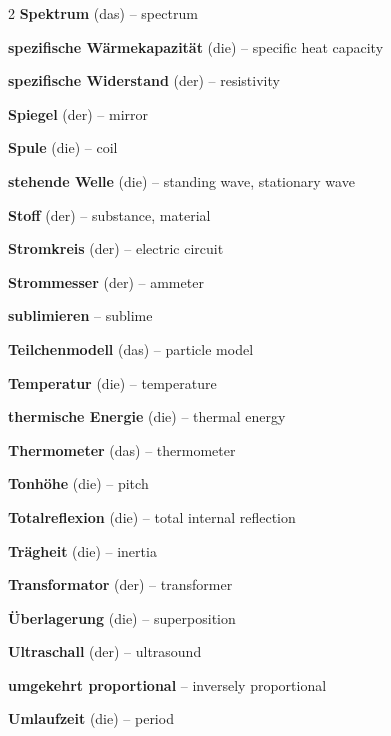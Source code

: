 \begin{multicols}{2}
\textbf{Spektrum} (das) -- spectrum\dotfill\hyperref[e:255]{\pageref*{e:255}}\par
\textbf{spezifische Wärmekapazität} (die) -- specific heat capacity\dotfill\hyperref[e:119]{\pageref*{e:119}}\par
\textbf{spezifische Widerstand} (der) -- resistivity\dotfill\hyperref[e:148]{\pageref*{e:148}}\par
\textbf{Spiegel} (der) -- mirror\dotfill\hyperref[e:232]{\pageref*{e:232}}\par
\textbf{Spule} (die) -- coil\dotfill\hyperref[e:181]{\pageref*{e:181}}\par
\textbf{stehende Welle} (die) -- standing wave, stationary wave\dotfill\hyperref[e:211]{\pageref*{e:211}}\par
\textbf{Stoff} (der) -- substance, material\dotfill\hyperref[e:29]{\pageref*{e:29}}\par
\textbf{Stromkreis} (der) -- electric circuit\dotfill\hyperref[e:153]{\pageref*{e:153}}\par
\textbf{Strommesser} (der) -- ammeter\dotfill\hyperref[e:160]{\pageref*{e:160}}\par
\textbf{sublimieren} -- sublime\dotfill\hyperref[e:134]{\pageref*{e:134}}\par

\par\nopagebreak
\textbf{Teilchenmodell} (das) -- particle model\dotfill\hyperref[e:124]{\pageref*{e:124}}\par
\textbf{Temperatur} (die) -- temperature\dotfill\hyperref[e:113]{\pageref*{e:113}}\par
\textbf{thermische Energie} (die) -- thermal energy\dotfill\hyperref[e:100]{\pageref*{e:100}}\par
\textbf{Thermometer} (das) -- thermometer\dotfill\hyperref[e:116]{\pageref*{e:116}}\par
\textbf{Tonhöhe} (die) -- pitch\dotfill\hyperref[e:214]{\pageref*{e:214}}\par
\textbf{Totalreflexion} (die) -- total internal reflection\dotfill\hyperref[e:238]{\pageref*{e:238}}\par
\textbf{Trägheit} (die) -- inertia\dotfill\hyperref[e:76]{\pageref*{e:76}}\par
\textbf{Transformator} (der) -- transformer\dotfill\hyperref[e:188]{\pageref*{e:188}}\par

\par\nopagebreak
\textbf{Überlagerung} (die) -- superposition\dotfill\hyperref[e:210]{\pageref*{e:210}}\par
\textbf{Ultraschall} (der) -- ultrasound\dotfill\hyperref[e:218]{\pageref*{e:218}}\par
\textbf{umgekehrt proportional} -- inversely proportional\dotfill\hyperref[e:26]{\pageref*{e:26}}\par
\textbf{Umlaufzeit} (die) -- period\dotfill\hyperref[e:51]{\pageref*{e:51}}\par


\end{multicols}
